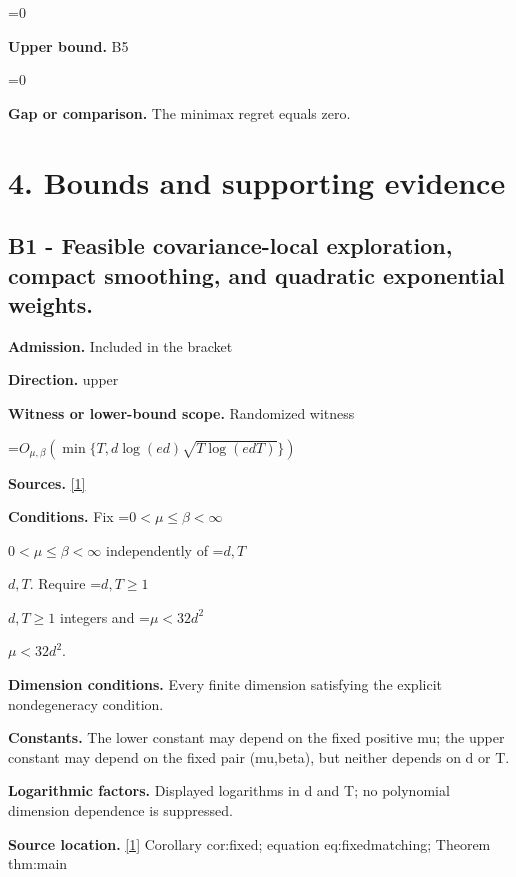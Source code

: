 \documentclass[10pt,a4paper]{article}
\newcommand{\AtlasMath}[1]{\par\begingroup\centering\setbox0=\hbox{$\displaystyle #1$}\ifdim\wd0>1.4\linewidth\typeout{ATLAS WIDE FORMULA: \the\wd0}\fi\ifdim\wd0>\linewidth\resizebox{\linewidth}{!}{\box0}\else\box0\fi\par\endgroup}
\newcommand{\AtlasInlineMath}[1]{\begingroup\setbox0=\hbox{$#1$}\ifdim\wd0>.4\linewidth\endgroup\AtlasMath{#1}\else\endgroup$#1$\fi}
\begin{document}
\AtlasMath{0}


\textbf{Upper bound.} B5



\AtlasMath{0}


\textbf{Gap or comparison.} The minimax regret equals zero.



\section{4. Bounds and supporting evidence}


\subsection{B1 - Feasible covariance-local exploration, compact smoothing, and quadratic exponential weights.}


\textbf{Admission.} Included in the bracket



\textbf{Direction.} upper



\textbf{Witness or lower-bound scope.} Randomized witness



\AtlasMath{O_{\mu,\beta}\!\left(\min\{T,d\log(ed)\sqrt{T\log(edT)}\}\right)}


\textbf{Sources.} \href{https://github.com/WU-Wendao/Colombo/blob/main/colombo_sensorium/Complexity_altas/data/sources/colombo/U01/manuscript.pdf}{[1]}



\textbf{Conditions.} Fix \AtlasInlineMath{0<\mu\le\beta<\infty} independently of \AtlasInlineMath{d,T}. Require \AtlasInlineMath{d,T\ge1} integers and \AtlasInlineMath{\mu<32d^2}.



\textbf{Dimension conditions.} Every finite dimension satisfying the explicit nondegeneracy condition.



\textbf{Constants.} The lower constant may depend on the fixed positive mu; the upper constant may depend on the fixed pair (mu,beta), but neither depends on d or T.



\textbf{Logarithmic factors.} Displayed logarithms in d and T; no polynomial dimension dependence is suppressed.



\textbf{Source location.} \href{https://github.com/WU-Wendao/Colombo/blob/main/colombo_sensorium/Complexity_altas/data/sources/colombo/U01/manuscript.pdf}{[1]} Corollary cor:fixed; equation eq:fixedmatching; Theorem thm:main
\end{document}
